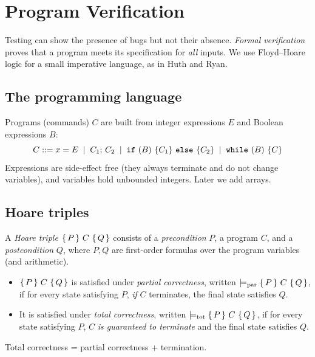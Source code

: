 \chapter{Program Verification}\label{ch:hoare}

Testing can show the presence of bugs but not their absence. \emph{Formal verification}
proves that a program meets its specification for \emph{all} inputs. We use Floyd--Hoare
logic for a small imperative language, as in Huth and Ryan.

\section{The programming language}

Programs (commands) $C$ are built from integer expressions $E$ and Boolean expressions $B$:
\[
C ::= x = E \;\mid\; C_1;\,C_2 \;\mid\; \texttt{if}\ (B)\ \{C_1\}\ \texttt{else}\ \{C_2\}
      \;\mid\; \texttt{while}\ (B)\ \{C\}
\]
Expressions are side-effect free (they always terminate and do not change variables), and
variables hold unbounded integers. Later we add arrays.

\section{Hoare triples}

\begin{definition}
A \emph{Hoare triple} $\{\,P\,\}\ C\ \{\,Q\,\}$ consists of a \emph{precondition} $P$, a program
$C$, and a \emph{postcondition} $Q$, where $P,Q$ are first-order formulas over the
program variables (and arithmetic).
\begin{itemize}
  \item $\{\,P\,\}\ C\ \{\,Q\,\}$ is satisfied under \emph{partial correctness}, written
        $\models_{\mathrm{par}}\{\,P\,\}\ C\ \{\,Q\,\}$, if for every state satisfying $P$, \emph{if} $C$
        terminates, the final state satisfies $Q$.
  \item It is satisfied under \emph{total correctness}, written $\models_{\mathrm{tot}}\{\,P\,\}\ C\ \{\,Q\,\}$, if
        for every state satisfying $P$, $C$ \emph{is guaranteed to terminate} and the
        final state satisfies $Q$.
\end{itemize}
\end{definition}

Total correctness = partial correctness + termination.

